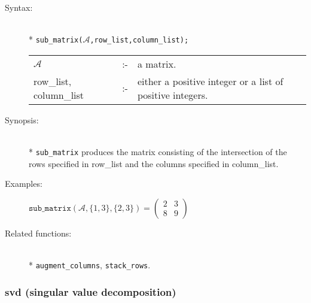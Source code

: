 \begin{description}
\item[Syntax:]\mbox{}\\*
\texttt{sub\_matrix($\mathcal{A}$,row\_list,column\_list);}\\[2mm]
\begin{tabular}{l l p{.605\linewidth}} 
$\mathcal{A}$              &:-& a matrix. \\
row\_list, column\_list &:-& either a 
positive integer or a list of positive integers.
\end{tabular}

\item[Synopsis:]\mbox{}\\*
\texttt{sub\_matrix} produces the matrix consisting of the
              intersection of the rows specified in row\_list and the 
columns specified in column\_list. 

\item[Examples:]
\begin{flushleft}  
\begin{math}  
\texttt{sub\_matrix}(\mathcal{A},\{1,3\},\{2,3\}) =
        \begin{pmatrix} 2 & 3 \\ 8 & 9 \end{pmatrix}
\end{math}  
\end{flushleft}

\item[Related functions:]\mbox{}\\*
\texttt{augment\_columns}, \texttt{stack\_rows}.
\end{description}


\subsubsection{svd (singular value decomposition)}
\label{linalg:svd}

